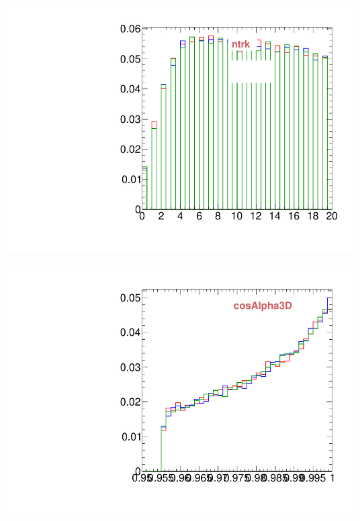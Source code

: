 \begin{figure}
        \centering
        \begin{subfigure}[b]{0.2\textwidth}
                \centering
                \includegraphics[width=\textwidth]{Figures/VariablesComparison/Data_barrel_figs_3h/ntrk}
                \label{fig:Data_barrel_ntrk_3h}
        \end{subfigure}
        \begin{subfigure}[b]{0.2\textwidth}
                \centering
                \includegraphics[width=\textwidth]{Figures/VariablesComparison/Data_barrel_figs_3h/cosAlpha3D}
                \label{fig:Data_barrel_cosAlpha3D_3h}
        \end{subfigure}
        \begin{subfigure}[b]{0.2\textwidth}

\end{subfigure}
\end{figure}
